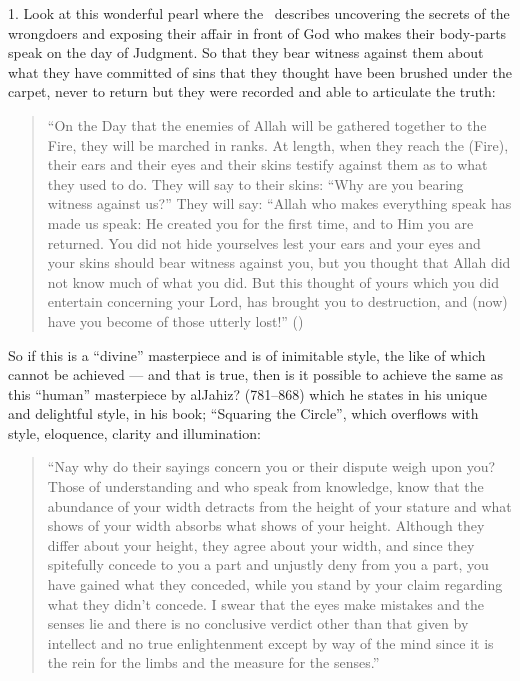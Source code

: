 \documentclass[12pt]{memoir}
\begin{document}
1. Look at this wonderful pearl where the \Quran\ describes uncovering
the secrets of the wrong\–doers and exposing their affair in front of God
who makes their body-parts speak on the day of Judgment.
So that they bear witness against them about what they have committed of sins
that they thought have been brushed under the carpet,
never to return but they were recorded and able to articulate the truth:

\begin{quote}
“On the Day that the enemies of Allah will be gathered together to the Fire,
they will be marched in ranks.
At length, when they reach the (Fire),
their ears and their eyes and their skins testify against them
as to what they used to do.
They will say to their skins: “Why are you bearing witness against us?”
They will say: “Allah who makes everything speak has made us speak:
He created you for the first time, and to Him you are returned.
You did not hide yourselves lest your ears and your eyes and
your skins should bear witness against you,
but you thought that Allah did not know much of what you did.
But this thought of yours which you did entertain concerning your Lord,
has brought you to destruction,
and (now) have you become of those utterly lost!” ()
\end{quote}

So if this is a “divine” masterpiece and is of inimitable style,
the like of which cannot be achieved —
and that is true, then is it possible to achieve
the same as this “human” masterpiece by al\–Jahiz? (781–868)
which he states in his unique and delightful style, in his book;
“Squaring the Circle”, which overflows with style,
eloquence, clarity and illumination:

\begin{quote}
“Nay why do their sayings concern you or their dispute weigh upon you?
Those of understanding and who speak from knowledge,
know that the abundance of your width detracts from the height of your stature
and what shows of your width absorbs what shows of your height.
Although they differ about your height, they agree about your width,
and since they spitefully concede to you a part and
unjustly deny from you a part, you have gained what they conceded,
while you stand by your claim regarding what they didn’t concede.
I swear that the eyes make mistakes and the senses lie and
there is no conclusive verdict other than that given by intellect and
no true enlightenment except by way of the mind since it is the rein
for the limbs and the measure for the senses.”\fnmark
\end{quote}
\end{document}
